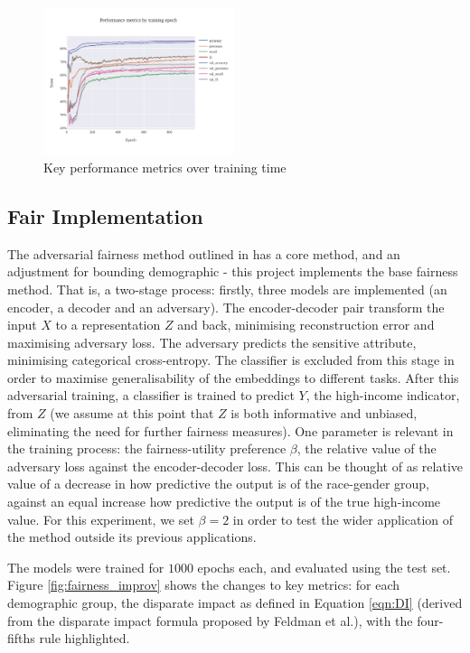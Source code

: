 \documentclass[conference]{IEEEtran}
\begin{document}
\begin{figure}[h]
    \centering
    \includegraphics[width=0.5\textwidth]{images/conv_performance.pdf}
    \caption{Key performance metrics over training time}
    \label{fig:conv_performance}
\end{figure}

\subsection{Fair Implementation}

The adversarial fairness method outlined in \cite{DBLP:journals/corr/abs-1802-06309} has a core method, and an adjustment for bounding demographic - this project implements the base fairness method. That is, a two-stage process: firstly, three models are implemented (an encoder, a decoder and an adversary). The encoder-decoder pair transform the input $X$ to a representation $Z$ and back, minimising reconstruction error and maximising adversary loss. The adversary predicts the sensitive attribute, minimising categorical cross-entropy. The classifier is excluded from this stage in order to maximise generalisability of the embeddings to different tasks. After this adversarial training, a classifier is trained to predict $Y$, the high-income indicator, from $Z$ (we assume at this point that $Z$ is both informative and unbiased, eliminating the need for further fairness measures). One parameter is relevant in the training process: the fairness-utility preference $\beta$, the relative value of the adversary loss against the encoder-decoder loss. This can be thought of as relative value of a decrease in how predictive the output is of the race-gender group, against an equal increase how predictive the output is of the true high-income value. For this experiment, we set $\beta = 2$ in order to test the wider application of the method outside its previous applications.

The models were trained for $1000$ epochs each, and evaluated using the test set. Figure \ref{fig:fairness_improv} shows the changes to key metrics: for each demographic group, the disparate impact as defined in Equation \ref{eqn:DI} (derived from the disparate impact formula proposed by Feldman et al.\cite{feldman2015certifying}), with the four-fifths rule highlighted.
\end{document}
